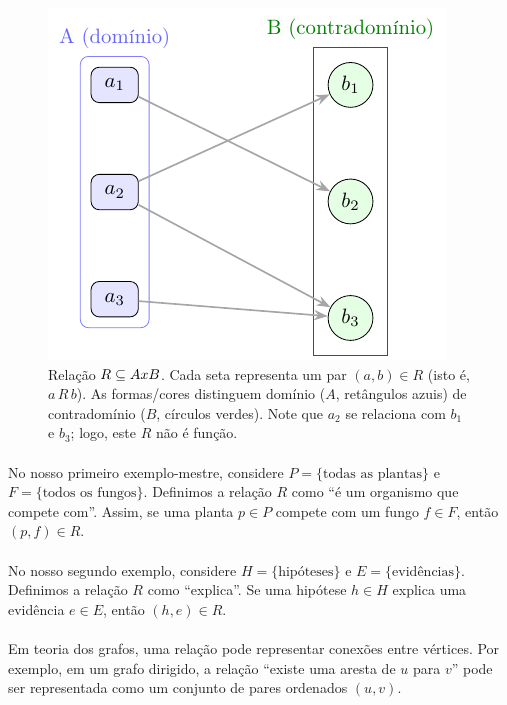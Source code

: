 \documentclass[12pt,a4paper]{article}
\def\emph#1{#1}%
\def\times{\string x}%
\begin{document}
\begin{figure}[H]
    \centering
    \includegraphics[width=0.9\linewidth]{figures/fig_relacao.pdf}

    \caption{Relação $R\subseteq A\times B$. Cada seta representa um par $(a,b)\in R$ (isto é, $a\,R\,b$). As formas/cores distinguem domínio ($A$, retângulos azuis) de contradomínio ($B$, círculos verdes). Note que $a_2$ se relaciona com $b_1$ e $b_3$; logo, este $R$ \emph{não é função}.}
    \label{fig:relacao}
\end{figure}


\paragraph{}
No nosso primeiro exemplo-mestre, considere \(P=\{\text{todas as plantas}\}\) e \(F=\{\text{todos os fungos}\}\). Definimos a relação \(R\) como ``é um organismo que compete com''. Assim, se uma planta \(p \in P\) compete com um fungo \(f \in F\), então \((p,f) \in R\).

\paragraph{}
No nosso segundo exemplo, considere \(H=\{\text{hipóteses}\}\) e \(E=\{\text{evidências}\}\). Definimos a relação \(R\) como ``explica''. Se uma hipótese \(h \in H\) explica uma evidência \(e \in E\), então \((h,e) \in R\).

\paragraph{}
Em teoria dos grafos, uma relação pode representar conexões entre vértices. Por exemplo, em um grafo dirigido, a relação ``existe uma aresta de \(u\) para \(v\)'' pode ser representada como um conjunto de pares ordenados \((u,v)\).
\end{document}
